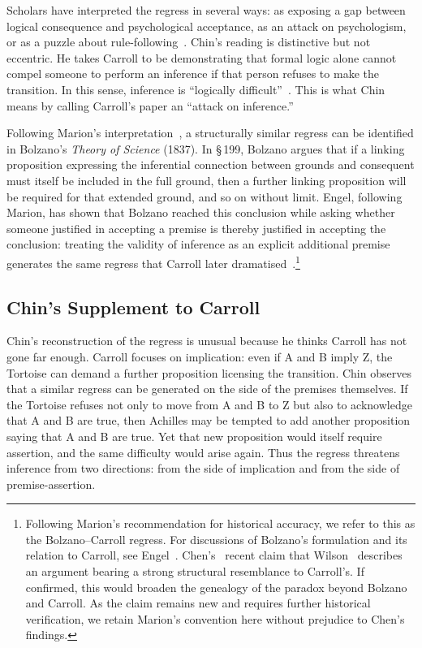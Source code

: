 \documentclass{birkjour}
\begin{document}
Scholars have interpreted the regress in several ways: as exposing a gap between logical consequence and psychological acceptance, as an attack on psychologism, or as a puzzle about rule-following~\cite{Marion2016, Philie2007, Imholtz2016}. Chin's reading is distinctive but not eccentric. He takes Carroll to be demonstrating that formal logic alone cannot compel someone to perform an inference if that person refuses to make the transition. In this sense, inference is ``logically difficult''~\cite[p.~34]{Liu2018}. This is what Chin means by calling Carroll's paper an ``attack on inference.''

Following Marion's interpretation~\cite[p.~53]{Marion2016}, a structurally similar regress can be identified in Bolzano's \textit{Theory of Science} (1837). In \S\,199, Bolzano argues that if a linking proposition expressing the inferential connection between grounds and consequent must itself be included in the full ground, then a further linking proposition will be required for that extended ground, and so on without limit. Engel, following Marion, has shown that Bolzano reached this conclusion while asking whether someone justified in accepting a premise is thereby justified in accepting the conclusion: treating the validity of inference as an explicit additional premise generates the same regress that Carroll later dramatised~\cite{Engel2016}.\footnote{Following Marion's recommendation for historical accuracy, we refer to this as the Bolzano--Carroll regress. For discussions of Bolzano's formulation and its relation to Carroll, see Engel~\cite{Engel2016}. Chen's~\cite{ChenM2026} recent claim that Wilson~\cite{Wilson1926} describes an argument bearing a strong structural resemblance to Carroll's. If confirmed, this would broaden the genealogy of the paradox beyond Bolzano and Carroll. As the claim remains new and requires further historical verification, we retain Marion's convention here without prejudice to Chen's findings.}

\subsection{Chin's Supplement to Carroll}

Chin's reconstruction of the regress is unusual because he thinks Carroll has not gone far enough. Carroll focuses on implication: even if A and B imply Z, the Tortoise can demand a further proposition licensing the transition. Chin observes that a similar regress can be generated on the side of the premises themselves. If the Tortoise refuses not only to move from A and B to Z but also to acknowledge that A and B are true, then Achilles may be tempted to add another proposition saying that A and B are true. Yet that new proposition would itself require assertion, and the same difficulty would arise again. Thus the regress threatens inference from two directions: from the side of implication and from the side of premise-assertion.
\end{document}

